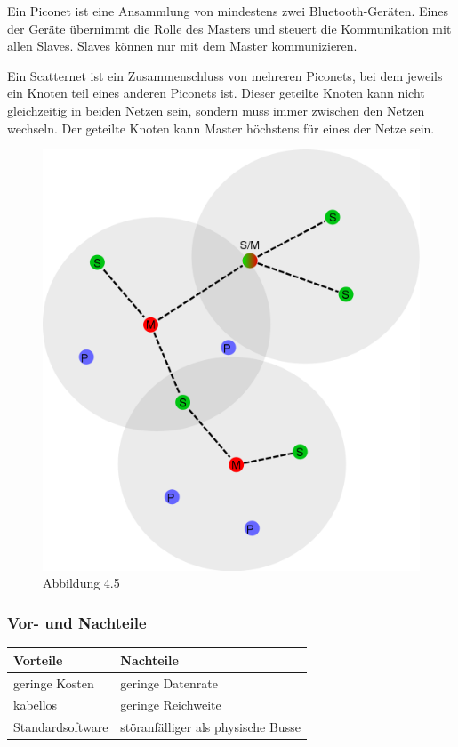 Ein Piconet ist eine Ansammlung von mindestens zwei Bluetooth-Geräten. Eines der Geräte übernimmt die Rolle des Masters und steuert die Kommunikation mit allen Slaves. Slaves können nur mit dem Master kommunizieren.

Ein Scatternet ist ein Zusammenschluss von mehreren Piconets, bei dem jeweils ein Knoten teil eines anderen Piconets ist. Dieser geteilte Knoten kann nicht gleichzeitig in beiden Netzen sein, sondern muss immer zwischen den Netzen wechseln. Der geteilte Knoten kann Master höchstens für eines der Netze sein.

\begin{figure}[h!]
	\includegraphics[width=0.7\linewidth]{pico-scatternet.png}
	\caption[https://de.wikipedia.org/wiki/Scatternet#/media/Datei:BluetoothScatternet-de.svg]{Abbildung 4.5}
	\label{fig:pico}
\end{figure}

\subsubsection{Vor- und Nachteile}
\begin{tabular}{l|l}
	\textbf{Vorteile} & \textbf{Nachteile}\\
	\hline geringe Kosten & geringe Datenrate\\
	\hline kabellos & geringe Reichweite\\
	\hline Standardsoftware & störanfälliger als physische Busse\\
\end{tabular}